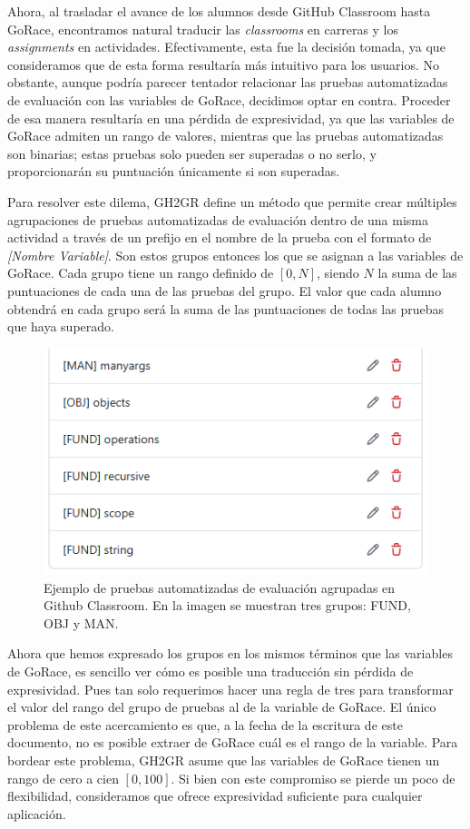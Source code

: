Ahora, al trasladar el avance de los alumnos desde GitHub Classroom hasta GoRace, encontramos natural traducir las \textit{classrooms} en carreras y los \textit{assignments} en actividades. Efectivamente, esta fue la decisión tomada, ya que consideramos que de esta forma resultaría más intuitivo para los usuarios. No obstante, aunque podría parecer tentador relacionar las pruebas automatizadas de evaluación con las variables de GoRace, decidimos optar en contra. Proceder de esa manera resultaría en una pérdida de expresividad, ya que las variables de GoRace admiten un rango de valores, mientras que las pruebas automatizadas son binarias; estas pruebas solo pueden ser superadas o no serlo, y proporcionarán su puntuación únicamente si son superadas.

Para resolver este dilema, GH2GR define un método que permite crear múltiples agrupaciones de pruebas automatizadas de evaluación dentro de una misma actividad a través de un prefijo en el nombre de la prueba con el formato de \textit{[Nombre Variable]}. Son estos grupos entonces los que se asignan a las variables de GoRace. Cada grupo tiene un rango definido de \([0,N]\), siendo \(N\) la suma de las puntuaciones de cada una de las pruebas del grupo. El valor que cada alumno obtendrá en cada grupo será la suma de las puntuaciones de todas las pruebas que haya superado.

\begin{figure}
    \centering
    \includegraphics[width=0.5\linewidth]{images/variable-groups-autograding-tests.png}
    \caption{Ejemplo de pruebas automatizadas de evaluación agrupadas en Github Classroom. En la imagen se muestran tres grupos: FUND, OBJ y MAN.}
    \label{fig:variable-groups-autograding-tests}
\end{figure}

Ahora que hemos expresado los grupos en los mismos términos que las variables de GoRace, es sencillo ver cómo es posible una traducción sin pérdida de expresividad. Pues tan solo requerimos hacer una regla de tres para transformar el valor del rango del grupo de pruebas al de la variable de GoRace. El único problema de este acercamiento es que, a la fecha de la escritura de este documento, no es posible extraer de GoRace cuál es el rango de la variable. Para bordear este problema, GH2GR asume que las variables de GoRace tienen un rango de cero a cien \([0,100]\). Si bien con este compromiso se pierde un poco de flexibilidad, consideramos que ofrece expresividad suficiente para cualquier aplicación.


